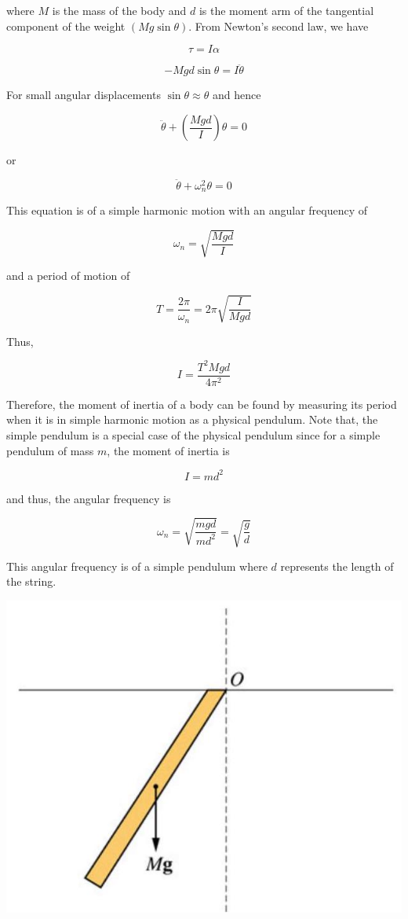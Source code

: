 \documentclass[10pt]{article}
\begin{document}
where $M$ is the mass of the body and $d$ is the moment arm of the tangential component of the weight $(M g \sin \theta)$. From Newton's second law, we have

$$
\tau=I \alpha
$$

$$
-M g d \sin \theta=I \ddot{\theta}
$$

For small angular displacements $\sin \theta \approx \theta$ and hence

$$
\ddot{\theta}+\left(\frac{M g d}{I}\right) \theta=0
$$

or

$$
\ddot{\theta}+\omega_{n}^{2} \theta=0
$$

This equation is of a simple harmonic motion with an angular frequency of

$$
\omega_{n}=\sqrt{\frac{M g d}{I}}
$$

and a period of motion of

$$
T=\frac{2 \pi}{\omega_{n}}=2 \pi \sqrt{\frac{I}{M g d}}
$$

Thus,

$$
I=\frac{T^{2} M g d}{4 \pi^{2}}
$$

Therefore, the moment of inertia of a body can be found by measuring its period when it is in simple harmonic motion as a physical pendulum. Note that, the simple pendulum is a special case of the physical pendulum since for a simple pendulum of mass $m$, the moment of inertia is

$$
I=m d^{2}
$$

and thus, the angular frequency is

$$
\omega_{n}=\sqrt{\frac{m g d}{m d^{2}}}=\sqrt{\frac{g}{d}}
$$

This angular frequency is of a simple pendulum where $d$ represents the length of the string.

\begin{center}
\includegraphics[max width=\textwidth]{2024_09_13_db1f357d2aad0a03eb2eg-172(2)}
\end{center}
\end{document}
